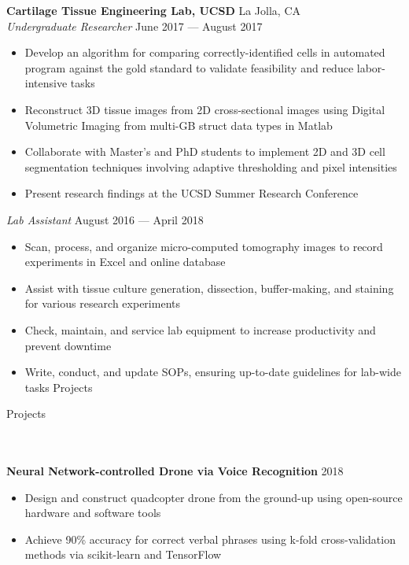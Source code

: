 \documentclass[a4paper]{article}
\newcommand{\lineunder} {
    \vspace*{-8pt} \\
    \hspace*{-18pt} \hrulefill \\
}
\newcommand{\header} [1] {
    {\hspace*{-18pt}\vspace*{6pt} \Large{#1} }
    \vspace*{-6pt} 
    \lineunder
}
\begin{document}
\vspace{-2mm}

\textbf{Cartilage Tissue Engineering Lab, UCSD} \hfill La Jolla, CA\\
\textit{Undergraduate Researcher} \hfill June 2017 --- August 2017\\
\vspace{-2mm}
\begin{itemize} \itemsep 0.1pt
	\item Develop an algorithm for comparing correctly-identified cells in automated program against the gold standard to validate feasibility and reduce labor-intensive tasks
	\item Reconstruct 3D tissue images from 2D cross-sectional images using Digital Volumetric Imaging from multi-GB struct data types in Matlab
	\item Collaborate with Master’s and PhD students to implement 2D and 3D cell segmentation techniques involving adaptive thresholding and pixel intensities
	\item Present research findings at the UCSD Summer Research Conference
\end{itemize}

\vspace{-2mm}

\textit{Lab Assistant} \hfill August 2016 --- April 2018\\
\vspace{-2mm}
\begin{itemize} \itemsep 0.1pt
	\item Scan, process, and organize micro-computed tomography images to record experiments in Excel and online database
	\item Assist with tissue culture generation, dissection, buffer-making, and staining for various research experiments
	\item Check, maintain, and service lab equipment to increase productivity and prevent downtime
	\item Write, conduct, and update SOPs, ensuring up-to-date guidelines for lab-wide tasks Projects
\end{itemize}
\vspace{2mm}

\header{Projects}
\textbf{Neural Network-controlled Drone via Voice Recognition} \hfill 2018
\vspace{-2mm}
\begin{itemize} \itemsep 0.1pt
	\item Design and construct quadcopter drone from the ground-up using open-source hardware and software tools
	\item Achieve 90\% accuracy for correct verbal phrases using k-fold cross-validation methods via scikit-learn and TensorFlow
\end{itemize}
\end{document}
